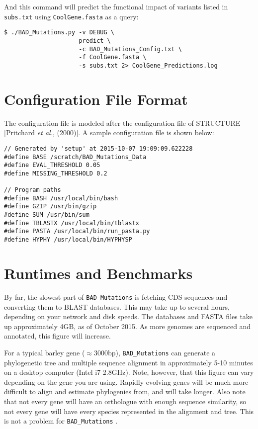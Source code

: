 \documentclass[12pt]{article}
\newcommand{\BM}{\texttt{BAD\_Mutations} }
\begin{document}
\par And this command will predict the functional impact of variants listed in
\texttt{subs.txt} using \texttt{CoolGene.fasta} as a query:
\begin{Verbatim}[frame=single, fontsize=\small, rulecolor=\color{gray}]
$ ./BAD_Mutations.py -v DEBUG \
                     predict \
                     -c BAD_Mutations_Config.txt \
                     -f CoolGene.fasta \
                     -s subs.txt 2> CoolGene_Predictions.log
\end{Verbatim}

\section*{Configuration File Format}
\par The configuration file is modeled after the configuration file of
STRUCTURE [Pritchard \textit{et al.}, (2000)]. A sample configuration file is
shown below:
\begin{Verbatim}[frame=single, fontsize=\small, rulecolor=\color{gray}]
// Generated by 'setup' at 2015-10-07 19:09:09.622228
#define BASE /scratch/BAD_Mutations_Data
#define EVAL_THRESHOLD 0.05
#define MISSING_THRESHOLD 0.2

// Program paths
#define BASH /usr/local/bin/bash
#define GZIP /usr/bin/gzip
#define SUM /usr/bin/sum
#define TBLASTX /usr/local/bin/tblastx
#define PASTA /usr/local/bin/run_pasta.py
#define HYPHY /usr/local/bin/HYPHYSP
\end{Verbatim}

\section*{Runtimes and Benchmarks}
\par By far, the slowest part of \BM is fetching CDS sequences and converting
them to BLAST databases. This may take up to several hours, depending on your
network and disk speeds. The databases and FASTA files take up approximately
4GB, as of October 2015. As more genomes are sequenced and annotated, this
figure will increase.

\par For a typical barley gene ($\approx$3000bp), \BM can generate a
phylogenetic tree and multiple sequence alignment in approximately 5-10 minutes
on a desktop computer (Intel i7 2.8GHz). Note, however, that this figure can
vary depending on the gene you are using. Rapidly evolving genes will be much
more difficult to align and estimate phylogenies from, and will take longer.
Also note that not every gene will have an orthologue with enough sequence
similarity, so not every gene will have every species represented in the
alignment and tree. This is not a problem for \BM.
\end{document}
